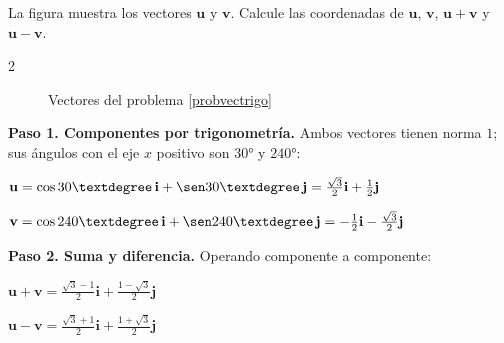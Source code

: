 \begin{example}\label{probvectrigo}
La figura muestra los vectores $\mathbf{u}$ y $\mathbf{v}$. Calcule las coordenadas de $\mathbf{u}$, $\mathbf{v}$, $\mathbf{u}+\mathbf{v}$ y $\mathbf{u}-\mathbf{v}$.

\begin{multicols}{2}
\begin{figure}[H]
\centering
{}
\caption{Vectores del problema \ref{probvectrigo}}
\label{fig:probvectrigo_datos}
\end{figure}

\columnbreak			

\begin{myproof}
\textbf{Paso 1. Componentes por trigonometría.} Ambos vectores tienen norma $1$; sus ángulos con el eje $x$ positivo son $30°$ y $240°$:

$\mathbf{u} = \cos 30°\,\mathbf{i} + \sen 30°\,\mathbf{j} = \frac{\sqrt{3}}{2}\mathbf{i} + \frac{1}{2}\mathbf{j}$

$\mathbf{v} = \cos 240°\,\mathbf{i} + \sen 240°\,\mathbf{j} = -\frac{1}{2}\mathbf{i} - \frac{\sqrt{3}}{2}\mathbf{j}$

\textbf{Paso 2. Suma y diferencia.} Operando componente a componente:

$\boxed{\mathbf{u}+\mathbf{v} = \frac{\sqrt{3}-1}{2}\mathbf{i} + \frac{1-\sqrt{3}}{2}\mathbf{j}}$

$\boxed{\mathbf{u}-\mathbf{v} = \frac{\sqrt{3}+1}{2}\mathbf{i} + \frac{1+\sqrt{3}}{2}\mathbf{j}}$
\end{myproof}
\end{multicols}
\end{example}

